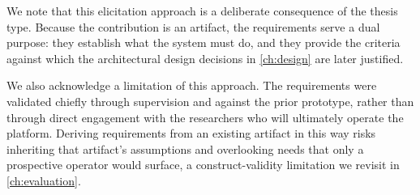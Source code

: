 We note that this elicitation approach is a deliberate consequence of the thesis type.
Because the contribution is an artifact, the requirements serve a dual purpose: they establish what the system must do, and they provide the criteria against which the architectural design decisions in \cref{ch:design} are later justified.

We also acknowledge a limitation of this approach.
The requirements were validated chiefly through supervision and against the prior prototype, rather than through direct engagement with the researchers who will ultimately operate the platform.
Deriving requirements from an existing artifact in this way risks inheriting that artifact's assumptions and overlooking needs that only a prospective operator would surface, a construct-validity limitation we revisit in \cref{ch:evaluation}.
